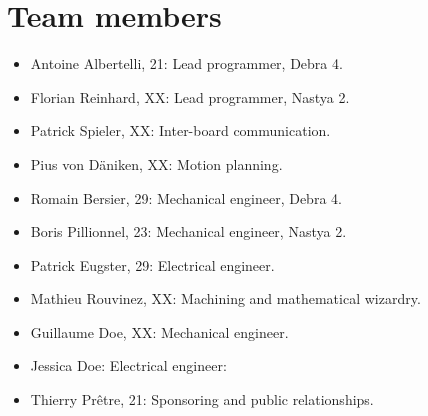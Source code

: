 \documentclass[a4paper]{paper}
\begin{document}
\section{Team members}
\begin{itemize}
    \item Antoine Albertelli, 21:  Lead programmer, Debra 4.
    \item Florian Reinhard, XX:  Lead programmer, Nastya 2.
    \item Patrick Spieler, XX:  Inter-board communication.
    \item Pius von Däniken, XX:  Motion planning.
    \item Romain Bersier, 29:  Mechanical engineer, Debra 4.
    \item Boris Pillionnel, 23:  Mechanical engineer, Nastya 2.
    \item Patrick Eugster, 29:  Electrical engineer.
    \item Mathieu Rouvinez, XX:  Machining and mathematical wizardry.
    \item Guillaume Doe, XX: Mechanical engineer.
    \item Jessica Doe: Electrical engineer:
    \item Thierry Prêtre, 21:  Sponsoring and public relationships.
\end{itemize}

\clearpage


\end{document}
